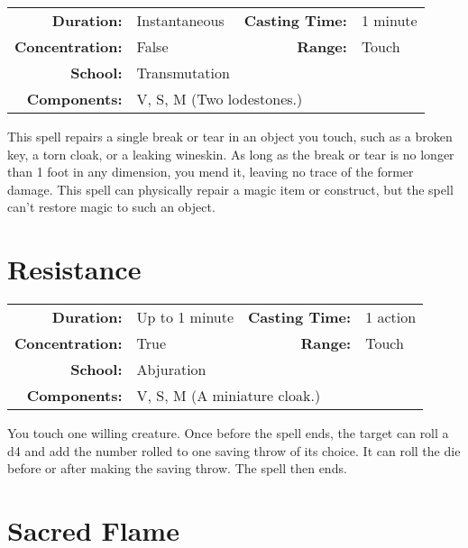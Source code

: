 \documentclass[a5paper, 12pt]{memoir}
\begin{document}
{
\small\centering\vspace{-6pt}
\begin{tabular}{rlrl}
\toprule

\textbf{Duration:} & Instantaneous &
\textbf{Casting Time:} & 1 minute \\
\textbf{Concentration:} & False &
\textbf{Range:} & Touch \\
\textbf{School:} & Transmutation \\
\textbf{Components:} & \multicolumn{3}{p{0.7\textwidth}}{V, S, M (Two lodestones.)}\\

\bottomrule
\end{tabular}
}

\vspace{1\baselineskip}\noindent This spell repairs a single break or tear in an object you touch, such as a broken key, a torn cloak, or a leaking wineskin. As long as the break or tear is no longer than 1 foot in any dimension, you mend it, leaving no trace of the former damage. This spell can physically repair a magic item or construct, but the spell can't restore magic to such an object.

\newpage
\section*{Resistance}

{
\small\centering\vspace{-6pt}
\begin{tabular}{rlrl}
\toprule

\textbf{Duration:} & Up to 1 minute &
\textbf{Casting Time:} & 1 action \\
\textbf{Concentration:} & True &
\textbf{Range:} & Touch \\
\textbf{School:} & Abjuration \\
\textbf{Components:} & \multicolumn{3}{p{0.7\textwidth}}{V, S, M (A miniature cloak.)}\\

\bottomrule
\end{tabular}
}

\vspace{1\baselineskip}\noindent You touch one willing creature. Once before the spell ends, the target can roll a d4 and add the number rolled to one saving throw of its choice. It can roll the die before or after making the saving throw. The spell then ends.

\newpage
\section*{Sacred Flame}
\end{document}
